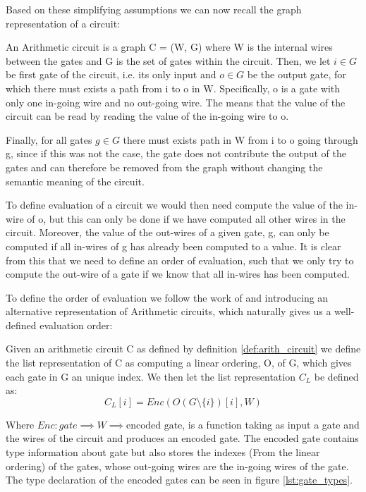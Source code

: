 Based on these simplifying assumptions we can now recall the graph
representation of a circuit:
\begin{definition}
  \label{def:arith_circuit}
  An Arithmetic circuit is a graph C = (W, G) where W is the internal
  wires between the gates and G is the set of gates within the circuit. Then,
  we let $i \in G$ be first gate of the circuit, i.e. its only input and $o \in G$ be the output
  gate, for which there must exists a path from i to o in W.
  Specifically, o is a gate with only one in-going wire and no out-going wire.
  The means that the value of the circuit can be read by reading the value of
  the in-going wire to o.


  Finally, for all gates $g \in G$ there must exists path in W from i to o going
  through g,
  since if this was not the case, the gate does not contribute the output of the
  gates and can therefore be removed from the graph without changing the
  semantic meaning of the circuit.
\end{definition}

To define evaluation of a circuit we would then need compute the value of the
in-wire of o, but this can only be done if we have computed all other wires in
the circuit. Moreover, the value of the out-wires of a given gate, g, can only
be computed if all in-wires of g has already been computed to a value. It is
clear from this that we need to define an order of evaluation, such that we only
try to compute the out-wire of a gate if we know that all in-wires has been computed.

To define the order of evaluation we follow the work of \cite{Yao} and introducing an alternative
representation of Arithmetic circuits, which naturally gives us a well-defined
evaluation order:

\begin{definition}
  Given an arithmetic circuit C as defined by definition \ref{def:arith_circuit}
  we define the list representation of C as computing a linear ordering, O, of
  G, which gives each gate in G an unique index.
  We then let the list representation $C_{L}$ be defined as:
  \[
    C_{L}[i] = Enc(O( G \setminus \{i\})[i], W)
  \]

  Where $Enc : gate \implies W \implies \text{encoded gate}$, is a function
  taking as input a gate and the wires of the circuit and produces an encoded
  gate.
  The encoded gate contains type information about gate but also stores the
  indexes (From the linear ordering) of the gates, whose out-going wires are the
  in-going wires of the gate.
  The type declaration of the encoded gates can be seen in figure \ref{lst:gate_types}.
\end{definition}

